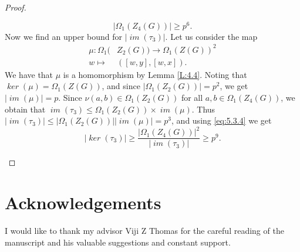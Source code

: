 \documentclass[preprint,sort&compress,12pt]{elsarticle}
\theoremstyle{definition}
\numberwithin{equation}{theorem}
\DeclareMathOperator{\Ker}{\mathit{ker}}
\DeclareMathOperator{\im}{\mathit{im}}
\begin{document}
\begin{proof}
\begin{itemize}
\begin{equation}\label{eq:5.3.4}
|\Omega_1(Z_4(G))|\ge p^6.
\end{equation}
\noindent Now we find an upper bound for $|\im(\tau_3)|$. Let us consider the map 
\begin{align*}
\mu: \Omega_1(&Z_2(G))\rightarrow \Omega_1(Z(G))^2\\
w\mapsto& ([w, y], [w, x]).
\end{align*}
We have that $\mu$ is a homomorphism by Lemma \ref{L:4.4}. Noting that $\Ker(\mu)=\Omega_1(Z(G))$, and since $|\Omega_1(Z_2(G))|=p^2$, we get $|\im(\mu)|=p$. Since $\nu(a, b)\in \Omega_1(Z_2(G))$ for all $a, b\in \Omega_1(Z_4(G))$, we obtain that $\im(\tau_3)\le \Omega_1(Z_2(G))\times \im(\mu)$. Thus $|\im(\tau_3)|\le |\Omega_1(Z_2(G))| |\im(\mu)|=p^3$, and using \eqref{eq:5.3.4} we get
\begin{equation*}
|\Ker(\tau_3)|\ge \frac{|\Omega_1(Z_4(G))|^2}{|\im(\tau_3)|}\ge p^9.
\end{equation*}
\end{itemize}
\end{proof}

\section*{Acknowledgements}
I would like to thank my advisor Viji Z Thomas for the careful reading of the manuscript and his valuable suggestions and constant support.



\end{document}
